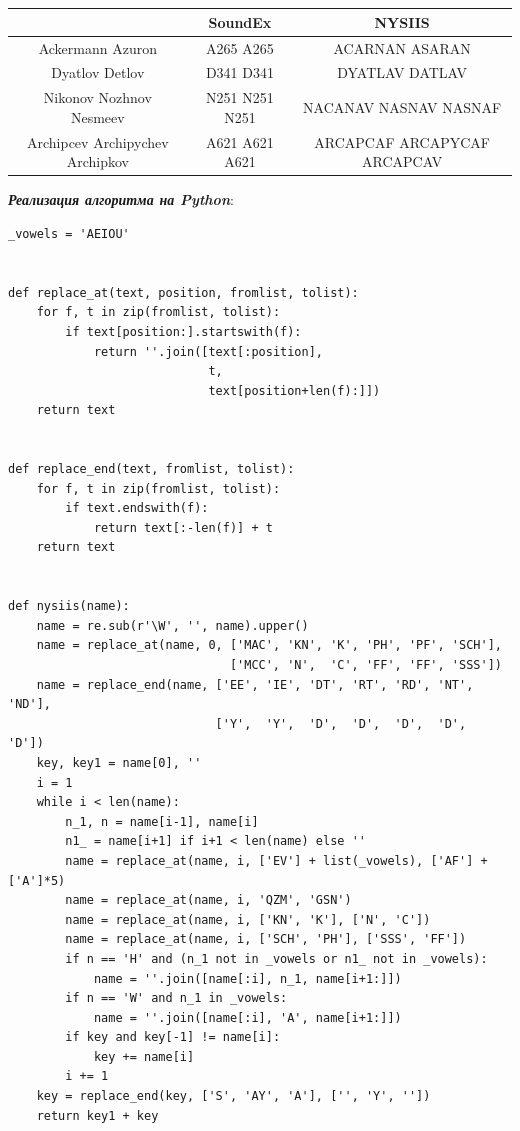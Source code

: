 \documentclass[titlepage,12pt]{article}
\begin{document}
\\
\\
\begin{tabular}{|c|c|c|}
    \hline
    & SoundEx & NYSIIS\\
    \hline 
    Ackermann Azuron & A265 A265 & ACARNAN ASARAN\\
    \hline
    Dyatlov Detlov & D341 D341 & DYATLAV DATLAV\\
    \hline
    Nikonov Nozhnov Nesmeev & N251 N251 N251 & NACANAV NASNAV NASNAF\\
    \hline
    Archipcev Archipychev Archipkov & A621 A621 A621 & ARCAPCAF ARCAPYCAF ARCAPCAV\\
    \hline
\end{tabular}
\newpage
\textit{\textbf{Реализация алгоритма на Python}}:
\begin{verbatim}
_vowels = 'AEIOU'


def replace_at(text, position, fromlist, tolist):
    for f, t in zip(fromlist, tolist):
        if text[position:].startswith(f):
            return ''.join([text[:position],
                            t,
                            text[position+len(f):]])
    return text


def replace_end(text, fromlist, tolist):
    for f, t in zip(fromlist, tolist):
        if text.endswith(f):
            return text[:-len(f)] + t
    return text


def nysiis(name):
    name = re.sub(r'\W', '', name).upper()
    name = replace_at(name, 0, ['MAC', 'KN', 'K', 'PH', 'PF', 'SCH'],
                               ['MCC', 'N',  'C', 'FF', 'FF', 'SSS'])
    name = replace_end(name, ['EE', 'IE', 'DT', 'RT', 'RD', 'NT', 'ND'],
                             ['Y',  'Y',  'D',  'D',  'D',  'D',  'D'])
    key, key1 = name[0], ''
    i = 1
    while i < len(name):
        n_1, n = name[i-1], name[i]
        n1_ = name[i+1] if i+1 < len(name) else ''
        name = replace_at(name, i, ['EV'] + list(_vowels), ['AF'] + ['A']*5)
        name = replace_at(name, i, 'QZM', 'GSN')
        name = replace_at(name, i, ['KN', 'K'], ['N', 'C'])
        name = replace_at(name, i, ['SCH', 'PH'], ['SSS', 'FF'])
        if n == 'H' and (n_1 not in _vowels or n1_ not in _vowels):
            name = ''.join([name[:i], n_1, name[i+1:]])
        if n == 'W' and n_1 in _vowels:
            name = ''.join([name[:i], 'A', name[i+1:]])
        if key and key[-1] != name[i]:
            key += name[i]
        i += 1
    key = replace_end(key, ['S', 'AY', 'A'], ['', 'Y', ''])
    return key1 + key
\end{verbatim}
\end{document}
